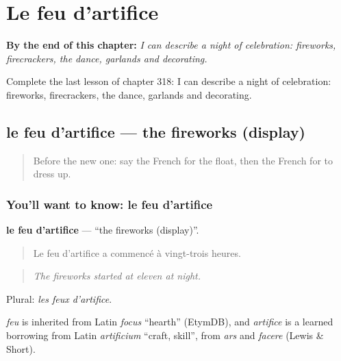 
\chapter{Le feu d'artifice}
\label{ch:fr-le-feu-d-artifice}

\begin{chapteropening}
\textbf{By the end of this chapter:} \emph{I can describe a night of celebration: fireworks, firecrackers, the dance, garlands and decorating.}

Complete the last lesson of chapter 318: I can describe a night of celebration: fireworks, firecrackers, the dance, garlands and decorating.
\end{chapteropening}

\section[le feu d'artifice]{le feu d'artifice — the fireworks (display)}

\label{lesson:FR-C318-feu-d-artifice}



\begin{quote}
Before the new one: say the French for the float, then the French for to dress up.
\end{quote}

\subsection*{You'll want to know: le feu d'artifice}
\textbf{le feu d'artifice} — \textquotedblleft{}the fireworks (display)\textquotedblright{}.

\begin{quote}
Le feu d'artifice a commencé à vingt-trois heures.
\end{quote}

\begin{quote}
\emph{The fireworks started at eleven at night.}
\end{quote}

Plural: \emph{les feux d'artifice}.

\begin{cousinweb}
\emph{feu} is inherited from Latin \emph{focus} \textquotedblleft{}hearth\textquotedblright{} (EtymDB), and \emph{artifice} is a learned borrowing from Latin \emph{artificium} \textquotedblleft{}craft, skill\textquotedblright{}, from \emph{ars} and \emph{facere} (Lewis \& Short).
\end{cousinweb}

